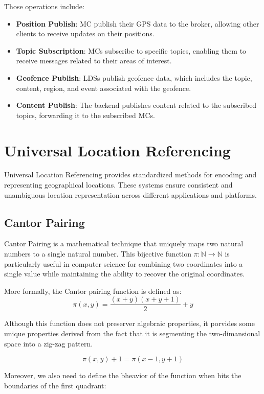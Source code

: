 Those operations include:
\begin{itemize}
    \item \textbf{Position Publish}: MC publish their GPS data to the broker, allowing other clients to receive updates on their positions.
    \item \textbf{Topic Subscription}: MCs subscribe to specific topics, enabling them to receive messages related to their areas of interest.
    \item \textbf{Geofence Publish}: LDSs publish geofence data, which includes the topic, content, region, and event associated with the geofence.
    \item \textbf{Content Publish}: The backend publishes content related to the subscribed topics, forwarding it to the subscribed MCs.
\end{itemize}

\section{Universal Location Referencing}
Universal Location Referencing provides standardized methods for encoding and representing geographical locations. These systems ensure consistent and unambiguous location representation across different applications and platforms.

\subsection{Cantor Pairing}

Cantor Pairing is a mathematical technique that uniquely maps two natural numbers to a single natural number. This bijective function $\pi: \mathbb{N} \to \mathbb{N}$ is particularly useful in computer science for combining two coordinates into a single value while maintaining the ability to recover the original coordinates.

More formally, the Cantor pairing function is defined as:
\[
    \pi(x, y) = \frac{(x + y)(x + y + 1)}{2} + y
\]

Although this function does not preserver algebraic properties, it porvides some unique properties derived from the fact that it is segmenting the two-dimansional space into a zig-zag pattern.

\[
    \pi(x, y) + 1 = \pi(x - 1, y + 1)
\]

Moreover, we also need to define the bheavior of the function when hits the boundaries of the first quadrant:

